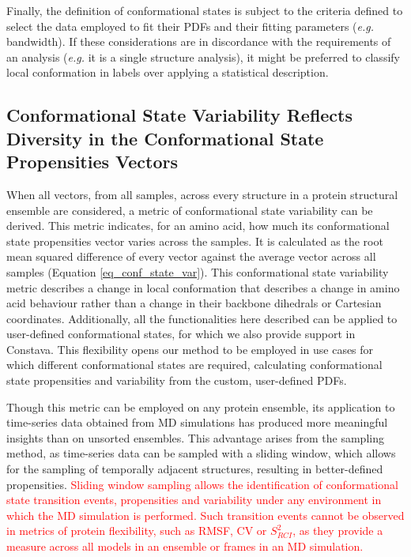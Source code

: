 Finally, the definition of conformational states is subject to the criteria defined to select the data employed to fit their PDFs and their fitting parameters (\textit{e.g.} bandwidth). If these considerations are in discordance with the requirements of an analysis (\textit{e.g.} it is a single structure analysis), it might be preferred to classify local conformation in labels over applying a statistical description. 


\subsection{Conformational State Variability Reflects Diversity in the Conformational State Propensities Vectors}

When all vectors, from all samples, across every structure in a protein structural ensemble are considered, a metric of conformational state variability can be derived. This metric indicates, for an amino acid, how much its conformational state propensities vector varies across the samples. It is calculated as the root mean squared difference of every vector against the average vector across all samples (Equation \ref{eq_conf_state_var}). This conformational state variability metric describes a change in local conformation that describes a change in amino acid behaviour rather than a change in their backbone dihedrals or Cartesian coordinates. Additionally, all the functionalities here described can be applied to user-defined conformational states, for which we also provide support in Constava. This flexibility opens our method to be employed in use cases for which different conformational states are required, calculating conformational state propensities and variability from the custom, user-defined PDFs.

Though this metric can be employed on any protein ensemble, its application to time-series data obtained from MD simulations has produced more meaningful insights than on unsorted ensembles. This advantage arises from the sampling method, as time-series data can be sampled with a sliding window, which allows for the sampling of temporally adjacent structures, resulting in better-defined propensities. \textcolor{red}{Sliding window sampling allows the identification of conformational state transition events, propensities and variability under any environment in which the MD simulation is performed. Such transition events cannot be observed in metrics of protein flexibility, such as RMSF, CV or $S^{2}_{RCI}$, as they provide a measure across all models in an ensemble or frames in an MD simulation.} 

